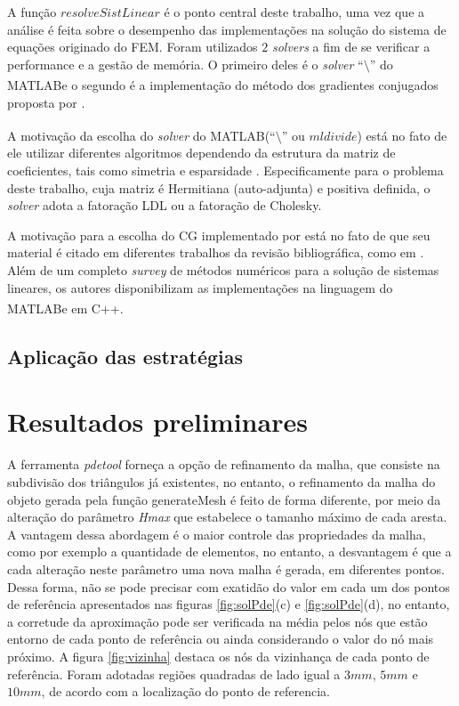 \documentclass[
    12pt,               %
    openright,          %
    oneside,
    a4paper,            %
    english,            %
    french,             %
    spanish,            %
    brazil              %
    ]{abntex2}
\newcommand{\matlab}{MATLAB\textsuperscript{\textregistered}}
\begin{document}
A função $resolveSistLinear$ é o ponto central deste trabalho, uma vez que a análise é feita sobre o desempenho das implementações na solução do sistema de equações originado do FEM. Foram utilizados $2$ \textit{solvers} a fim de se verificar a performance e a gestão de memória. O primeiro deles é o \textit{solver} ``$\setminus$'' do \matlab e o segundo é a implementação do método dos gradientes conjugados proposta por . 

A motivação da escolha do \textit{solver} do \matlab (``$\setminus$'' ou $mldivide$) está no fato de ele utilizar diferentes algoritmos dependendo da estrutura da matriz de coeficientes, tais como simetria e esparsidade \cite{matMldivide}. Especificamente para o problema deste trabalho, cuja matriz é Hermitiana (auto-adjunta) e positiva definida, o \textit{solver} adota a fatoração LDL ou a fatoração de Cholesky.

A motivação para a escolha do CG implementado por  está no fato de que seu material é citado em diferentes trabalhos da revisão bibliográfica, como em . Além de um completo \textit{survey} de métodos numéricos para a solução de sistemas lineares, os autores disponibilizam as implementações na linguagem do \matlab e em C++.





\subsection{Aplicação das estratégias}

\section{Resultados preliminares}
A ferramenta \textit{pdetool} forneça a opção de refinamento da malha, que consiste na subdivisão dos triângulos já existentes, no entanto, o refinamento da malha do objeto gerada pela função generateMesh é feito de forma diferente, por meio da alteração do parâmetro \textit{Hmax} que estabelece o tamanho máximo de cada aresta. A vantagem dessa abordagem é o maior controle das propriedades da malha, como por exemplo a quantidade de elementos, no entanto, a desvantagem é que a cada alteração neste parâmetro uma nova malha é gerada, em diferentes pontos. Dessa forma, não se pode precisar com exatidão do valor em cada um dos pontos de referência apresentados nas figuras \ref{fig:solPde}{(c)} e \ref{fig:solPde}{(d)}, no entanto, a corretude da aproximação pode ser verificada na média pelos nós que estão entorno de cada ponto de referência ou ainda considerando o valor do nó mais próximo. A figura \ref{fig:vizinha} destaca os nós da vizinhança de cada ponto de referência. Foram adotadas regiões quadradas de lado igual a $3mm$, $5mm$ e $10mm$, de acordo com a localização do ponto de referencia.
\end{document}
